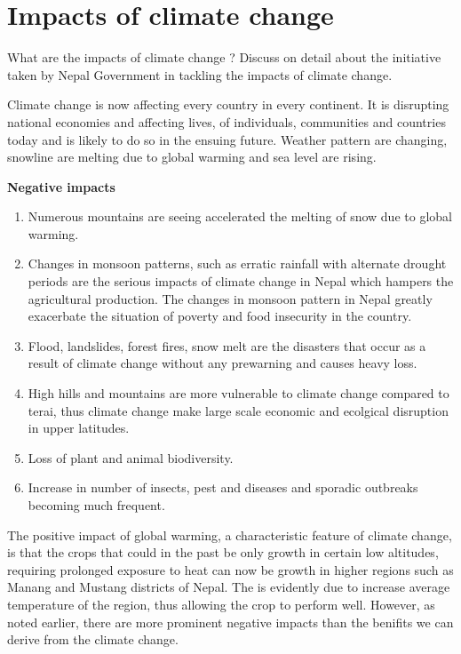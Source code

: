 \documentclass[
  openany]{book}
\providecommand{\tightlist}{%
  \setlength{\itemsep}{0pt}\setlength{\parskip}{0pt}}
\begin{document}
\hypertarget{impacts-of-climate-change}{%
\section{Impacts of climate change}\label{impacts-of-climate-change}}

What are the impacts of climate change ? Discuss on detail about the initiative taken by Nepal Government in tackling the impacts of climate change.

Climate change is now affecting every country in every continent. It is disrupting national economies and affecting lives, of individuals, communities and countries today and is likely to do so in the ensuing future. Weather pattern are changing, snowline are melting due to global warming and sea level are rising.

\textbf{Negative impacts}

\begin{enumerate}
\def\labelenumi{\arabic{enumi}.}
\tightlist
\item
  Numerous mountains are seeing accelerated the melting of snow due to global warming.
\item
  Changes in monsoon patterns, such as erratic rainfall with alternate drought periods are the serious impacts of climate change in Nepal which hampers the agricultural production. The changes in monsoon pattern in Nepal greatly exacerbate the situation of poverty and food insecurity in the country.
\item
  Flood, landslides, forest fires, snow melt are the disasters that occur as a result of climate change without any prewarning and causes heavy loss.
\item
  High hills and mountains are more vulnerable to climate change compared to terai, thus climate change make large scale economic and ecolgical disruption in upper latitudes.
\item
  Loss of plant and animal biodiversity.
\item
  Increase in number of insects, pest and diseases and sporadic outbreaks becoming much frequent.
\end{enumerate}

The positive impact of global warming, a characteristic feature of climate change, is that the crops that could in the past be only growth in certain low altitudes, requiring prolonged exposure to heat can now be growth in higher regions such as Manang and Mustang districts of Nepal. The is evidently due to increase average temperature of the region, thus allowing the crop to perform well. However, as noted earlier, there are more prominent negative impacts than the benifits we can derive from the climate change.
\end{document}
